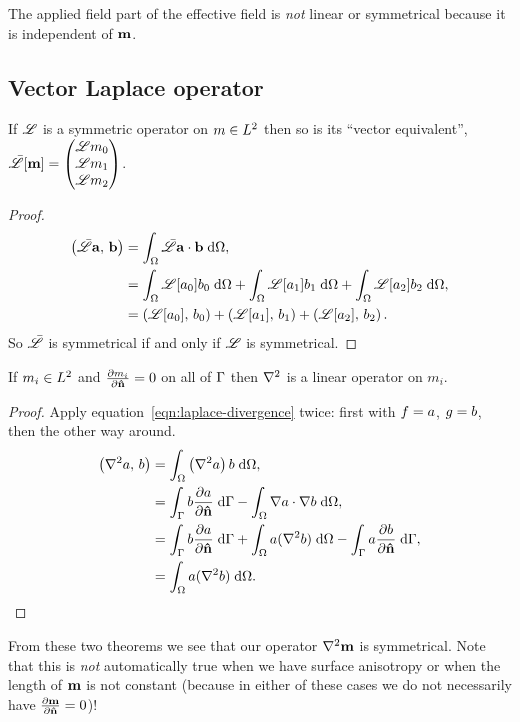 The applied field part of the effective field is \emph{not} linear or symmetrical because it is independent of $\mv$.

\subsection{Vector Laplace operator}

\begin{theorem}
  If $\lop$ is a symmetric operator on $m \in \ltwo$ then so is its ``vector equivalent'', $\bar{\lop}[\mv] = \threevec{\lop m_0}{\lop m_1}{\lop m_2}$.
\end{theorem}

\begin{proof}
  \begin{equation}
    \begin{aligned}
      \ip{\bar{\lop}\av}{\bv} &= \intd{ \bar{\lop} \av \cdot \bv}, \\
      &= \intd{\lop[a_0] b_0} + \intd{\lop[a_1] b_1} + \intd{\lop[a_2] b_2}, \\
      & = \ip{\lop[a_0]}{b_0} + \ip{\lop[a_1]}{b_1} + \ip{\lop[a_2]}{b_2}.
    \end{aligned}
  \end{equation}
  So $\bar{\lop}$ is symmetrical if and only if $\lop$ is symmetrical.
\end{proof}

\begin{theorem}
  If $m_i \in \ltwo$ and $\ddn{m_i} = 0$ on all of $\boundd$ then $\lap$ is a linear operator on $m_i$.
\end{theorem}
\begin{proof}
  Apply equation~\eqref{eqn:laplace-divergence} twice: first with $\ff = a$, $\gf = b$, then the other way around.
  \begin{equation}
    \begin{aligned}
      \ip{\lap a}{b} &= \intd{\left(\lap a \right) b}, \\
      &= \intb{b \ddn{a}} - \intd{\nabla a \cdot \nabla b}, \\
      &= \intb{b \ddn{a}} + \intd{a (\lap b)} - \intb{a \ddn{b}}, \\
      &= \intd{a (\lap b)}.
    \end{aligned}
  \end{equation}
\end{proof}

From these two theorems we see that our operator $\lap \mv$ is symmetrical. Note that this is \emph{not} automatically true when we have surface anisotropy or when the length of $\mv$ is not constant (because in either of these cases we do not necessarily have $\ddn{\mv} = 0$)!

